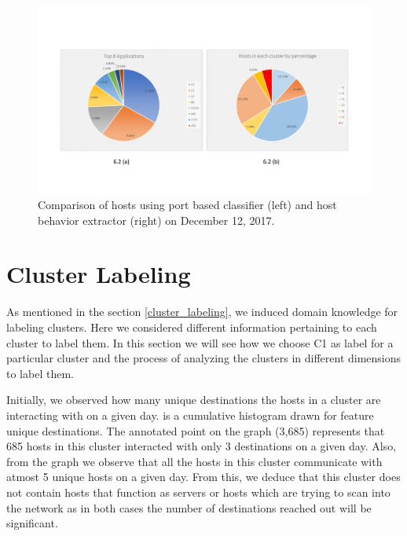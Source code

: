 \begin{figure}[t]
	\centerline{\includegraphics[trim=2cm 2cm 2cm 2cm, scale = 0.5]{dec12-port-behaviors.pdf}}
	\caption{Comparison of hosts using port based classifier (left) and host behavior extractor (right) on December 12, 2017.}%
\end{figure}

\section{Cluster Labeling}
As mentioned in the section \ref{cluster_labeling}, we induced domain knowledge for labeling clusters. Here we considered different information pertaining to each cluster to label them. In this section we will see how we choose C1 as label for a particular cluster and the process of analyzing the clusters in different dimensions to label them.

Initially, we observed how many unique destinations the hosts in a cluster are interacting with on a given day.  is a cumulative histogram drawn for feature unique destinations. The annotated point on the graph (3,685) represents that 685 hosts in this cluster interacted with only 3 destinations on a given day. Also, from the graph we observe that all the hosts in this cluster communicate with atmost 5 unique hosts on a given day. From this, we deduce that this cluster does not contain hosts that function as servers or hosts which are trying to scan into the network as in both cases the number of destinations reached out will be significant.


